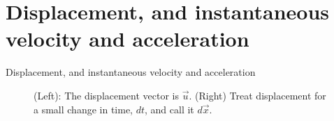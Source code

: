\documentclass{beamer}
\begin{document}
\section{Displacement, and instantaneous velocity and acceleration}

\begin{frame}{Displacement, and instantaneous velocity and acceleration}
\begin{figure}
\centering
{}
\caption{\label{fig:displacement} (Left): The displacement vector is $\vec{u}$.  (Right) Treat displacement for a small change in time, $dt$, and call it $d\vec{x}$.}
\end{figure}
\end{frame}
\end{document}
